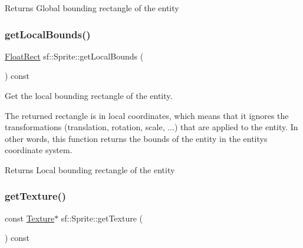\begin{DoxyReturn}{Returns}
Global bounding rectangle of the entity \begin{DoxyVerb}\end{DoxyVerb}
 
\end{DoxyReturn}
\mbox{\label{classsf_1_1_sprite_ab2f4c781464da6f8a52b1df6058a48b8}} 
\subsubsection{\texorpdfstring{getLocalBounds()}{getLocalBounds()}}
{\footnotesize\ttfamily \mbox{\hyperlink{classsf_1_1_rect}{Float\+Rect}} sf\+::\+Sprite\+::get\+Local\+Bounds (\begin{DoxyParamCaption}{ }\end{DoxyParamCaption}) const}



Get the local bounding rectangle of the entity. 

The returned rectangle is in local coordinates, which means that it ignores the transformations (translation, rotation, scale, ...) that are applied to the entity. In other words, this function returns the bounds of the entity in the entity\textquotesingle{}s coordinate system.

\begin{DoxyReturn}{Returns}
Local bounding rectangle of the entity \begin{DoxyVerb}\end{DoxyVerb}
 
\end{DoxyReturn}
\mbox{\label{classsf_1_1_sprite_a1a76155146c8ff37c4eb5a306b4e9ebe}} 
\subsubsection{\texorpdfstring{getTexture()}{getTexture()}}
{\footnotesize\ttfamily const \mbox{\hyperlink{classsf_1_1_texture}{Texture}}$\ast$ sf\+::\+Sprite\+::get\+Texture (\begin{DoxyParamCaption}{ }\end{DoxyParamCaption}) const}



